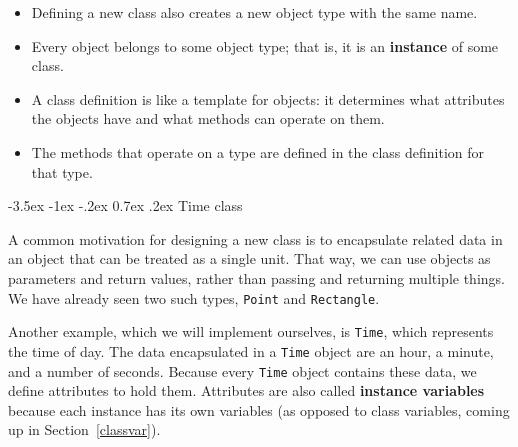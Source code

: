 \documentclass[12pt]{book}
\makeatletter
\theoremstyle{exercise}
\newcommand{\java}[1]{\verb"#1"}
\renewcommand{\section}{\@startsection{section}{1}{\z@}%
    {-3.5ex \@plus -1ex \@minus -.2ex}%
    {0.7ex \@plus.2ex}%
    {\normalfont\Large\bfseries}}
\newcommand{\java}[1]{\lstinline{#1}} %
\makeatother
\begin{document}
\begin{itemize}

\item Defining a new class also creates a new object type with the same name.


\item Every object belongs to some object type; that is, it is an {\bf instance} of some class.

\item A class definition is like a template for objects: it determines what attributes the objects have and what methods can operate on them.

\item The methods that operate on a type are defined in the class definition for that type.



\end{itemize}


\section{Time class}


A common motivation for designing a new class is to encapsulate related data in an object that can be treated as a single unit.
That way, we can use objects as parameters and return values, rather than passing and returning multiple things.
We have already seen two such types, \java{Point} and \java{Rectangle}.


Another example, which we will implement ourselves, is \java{Time}, which represents the time of day.
The data encapsulated in a \java{Time} object are an hour, a minute, and a number of seconds.
Because every \java{Time} object contains these data, we define attributes to hold them.
Attributes are also called {\bf instance variables} because each instance has its own variables (as opposed to class variables, coming up in Section~\ref{classvar}).
\end{document}
